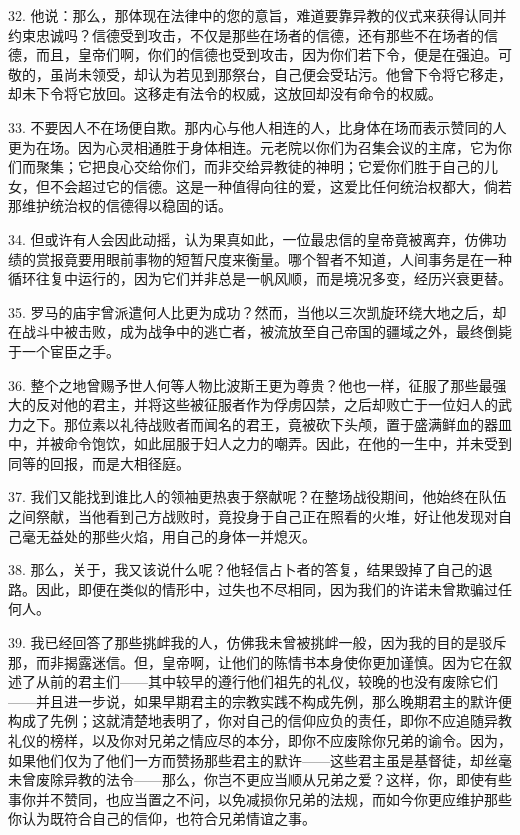 32. 他说：那么，那体现在法律中的您的意旨，难道要靠异教的仪式来获得认同并约束忠诚吗？信德受到攻击，不仅是那些在场者的信德，还有那些不在场者的信德，而且，皇帝们啊，你们的信德也受到攻击，因为你们若下令，便是在强迫。可敬的，虽尚未领受，却认为若见到那祭台，自己便会受玷污。他曾下令将它移走，却未下令将它放回。这移走有法令的权威，这放回却没有命令的权威。\par

33. 不要因人不在场便自欺。那内心与他人相连的人，比身体在场而表示赞同的人更为在场。因为心灵相通胜于身体相连。元老院以你们为召集会议的主席，它为你们而聚集；它把良心交给你们，而非交给异教徒的神明；它爱你们胜于自己的儿女，但不会超过它的信德。这是一种值得向往的爱，这爱比任何统治权都大，倘若那维护统治权的信德得以稳固的话。\par

34. 但或许有人会因此动摇，认为果真如此，一位最忠信的皇帝竟被离弃，仿佛功绩的赏报竟要用眼前事物的短暂尺度来衡量。哪个智者不知道，人间事务是在一种循环往复中运行的，因为它们并非总是一帆风顺，而是境况多变，经历兴衰更替。\par

35. 罗马的庙宇曾派遣何人比更为成功？然而，当他以三次凯旋环绕大地之后，却在战斗中被击败，成为战争中的逃亡者，被流放至自己帝国的疆域之外，最终倒毙于一个宦臣之手。\par

36. 整个之地曾赐予世人何等人物比波斯王更为尊贵？他也一样，征服了那些最强大的反对他的君主，并将这些被征服者作为俘虏囚禁，之后却败亡于一位妇人的武力之下。那位素以礼待战败者而闻名的君王，竟被砍下头颅，置于盛满鲜血的器皿中，并被命令饱饮，如此屈服于妇人之力的嘲弄。因此，在他的一生中，并未受到同等的回报，而是大相径庭。\par

37. 我们又能找到谁比人的领袖更热衷于祭献呢？在整场战役期间，他始终在队伍之间祭献，当他看到己方战败时，竟投身于自己正在照看的火堆，好让他发现对自己毫无益处的那些火焰，用自己的身体一并熄灭。\par

38. 那么，关于，我又该说什么呢？他轻信占卜者的答复，结果毁掉了自己的退路。因此，即便在类似的情形中，过失也不尽相同，因为我们的许诺未曾欺骗过任何人。\par

39. 我已经回答了那些挑衅我的人，仿佛我未曾被挑衅一般，因为我的目的是驳斥那，而非揭露迷信。但，皇帝啊，让他们的陈情书本身使你更加谨慎。因为它在叙述了从前的君主们——其中较早的遵行他们祖先的礼仪，较晚的也没有废除它们——并且进一步说，如果早期君主的宗教实践不构成先例，那么晚期君主的默许便构成了先例；这就清楚地表明了，你对自己的信仰应负的责任，即你不应追随异教礼仪的榜样，以及你对兄弟之情应尽的本分，即你不应废除你兄弟的谕令。因为，如果他们仅为了他们一方而赞扬那些君主的默许——这些君主虽是基督徒，却丝毫未曾废除异教的法令——那么，你岂不更应当顺从兄弟之爱？这样，你，即使有些事你并不赞同，也应当置之不问，以免减损你兄弟的法规，而如今你更应维护那些你认为既符合自己的信仰，也符合兄弟情谊之事。\par

